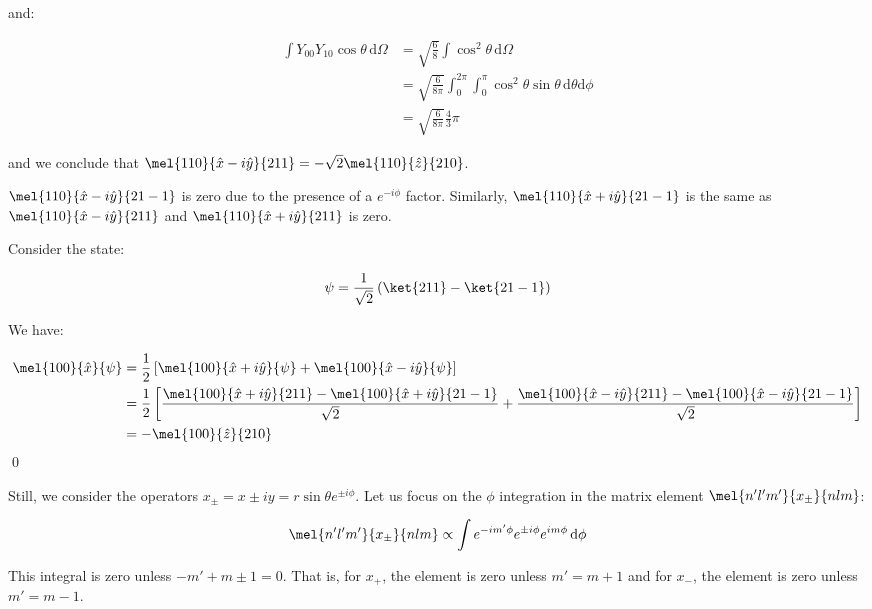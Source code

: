\documentclass[12pt]{article}
\begin{document}
and:

\begin{equation}
    \begin{split}
        \int Y_{00} Y_{10} \cos{\theta} \, \mathrm{d}\Omega &= \sqrt{\frac{6}{8}} \int \cos^{2}{\theta} \, \mathrm{d}\Omega \\
        &= \sqrt{\frac{6}{8\pi}} \int_{0}^{2\pi} \int_{0}^{\pi} \cos^{2}{\theta} \sin{\theta} \, \mathrm{d}\theta \mathrm{d}\phi \\
        &= \sqrt{\frac{6}{8\pi}} \frac{4}{3} \pi
    \end{split}
\end{equation}

and we conclude that $\mel{110}{\hat{x} - i\hat{y}}{211} = -\sqrt{2} \mel{110}{\hat{z}}{210}$.

$\mel{110}{\hat{x} - i\hat{y}}{21-1}$ is zero due to the presence of a $e^{-i\phi}$ factor. Similarly, $\mel{110}{\hat{x} + i\hat{y}}{21-1}$ is the same as $\mel{110}{\hat{x} - i\hat{y}}{211}$ and $\mel{110}{\hat{x} + i\hat{y}}{211}$ is zero.

Consider the state:

\begin{equation}
    \psi = \frac{1}{\sqrt{2}} \left( \ket{211} - \ket{21-1} \right)
\end{equation}

We have:

\begin{equation}
    \begin{split}
        \mel{100}{\hat{x}}{\psi} &= \frac{1}{2} \left[ \mel{100}{\hat{x} + i\hat{y}}{\psi} + \mel{100}{\hat{x} - i\hat{y}}{\psi} \right] \\
        &= \frac{1}{2} \left[ \frac{\mel{100}{\hat{x} + i\hat{y}}{211} - \mel{100}{\hat{x} + i\hat{y}}{21-1}}{\sqrt{2}} + \frac{\mel{100}{\hat{x} - i\hat{y}}{211} - \mel{100}{\hat{x} - i\hat{y}}{21-1}}{\sqrt{2}} \right] \\
        &= -\mel{100}{\hat{z}}{210}
    \end{split}
\end{equation}
\qed


Still, we consider the operators $x_{\pm} = x \pm iy = r \sin{\theta} e^{\pm i\phi}$. Let us focus on the $\phi$ integration in the matrix element $\mel{n'l'm'}{x_{\pm}}{nlm}$:

\begin{equation}
    \begin{split}
        \mel{n'l'm'}{x_{\pm}}{nlm} \propto \int e^{-im'\phi} e^{\pm i\phi} e^{im\phi} \, \mathrm{d}\phi
    \end{split}
\end{equation}

This integral is zero unless $-m' + m \pm 1 = 0$. That is, for $x_{+}$, the element is zero unless $m' = m + 1$ and for $x_{-}$, the element is zero unless $m' = m - 1$.
\end{document}
